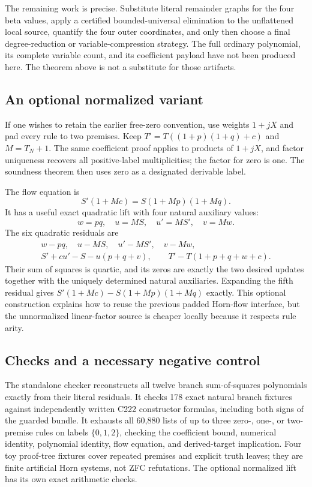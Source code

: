 The remaining work is precise.  Substitute literal remainder graphs for
the four beta values, apply a certified bounded-universal elimination to
the unflattened local source, quantify the four outer coordinates, and
only then choose a final degree-reduction or variable-compression
strategy.  The full ordinary polynomial, its complete variable count,
and its coefficient payload have not been produced here.  The theorem
above is not a substitute for those artifacts.

\subsection{An optional normalized variant}

If one wishes to retain the earlier free-zero convention, use weights
$1+jX$ and pad every rule to two premises.  Keep
$T'=T((1+p)(1+q)+c)$ and $M=T_N+1$.  The same coefficient proof applies
to products of $1+jX$, and factor uniqueness recovers all positive-label
multiplicities; the factor for zero is one.  The soundness theorem then
uses zero as a designated derivable label.

The flow equation is
\[
 S'(1+Mc)=S(1+Mp)(1+Mq).
\]
It has a useful exact quadratic lift with four natural auxiliary values:
\[
 w=pq,\quad u=MS,\quad u'=MS',\quad v=Mw.
\]
The six quadratic residuals are
\begin{gather*}
 w-pq,\quad u-MS,\quad u'-MS',\quad v-Mw,\\
 S'+cu'-S-u(p+q+v),\qquad T'-T(1+p+q+w+c).
\end{gather*}
Their sum of squares is quartic, and its zeros are exactly the two desired
updates together with the uniquely determined natural auxiliaries.
Expanding the fifth residual gives
$S'(1+Mc)-S(1+Mp)(1+Mq)$ exactly.  This optional construction explains
how to reuse the previous padded Horn-flow interface, but the unnormalized
linear-factor source is cheaper locally because it respects rule arity.

\subsection{Checks and a necessary negative control}

The standalone checker reconstructs all twelve branch sum-of-squares
polynomials exactly from their literal residuals.  It checks 178 exact
natural branch fixtures against independently written C222 constructor
formulas, including both signs of the guarded bundle.  It exhausts all
60,880 lists of up to three zero-, one-, or two-premise rules on labels
$\{0,1,2\}$, checking the coefficient bound, numerical identity,
polynomial identity, flow equation, and derived-target implication.
Four toy proof-tree fixtures cover repeated premises and explicit truth
leaves; they are finite artificial Horn systems, not ZFC refutations.
The optional normalized lift has its own exact arithmetic checks.

